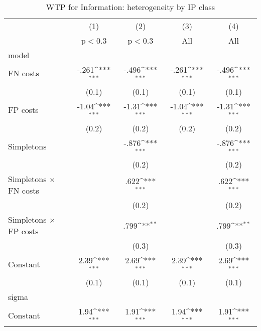 \begin{table}[htbp]\centering
\def\sym#1{\ifmmode^{#1}\else\(^{#1}\)\fi}
\caption{WTP for Information: heterogeneity by IP class}
\begin{tabular}{l*{4}{c}}
\hline\hline
                &\multicolumn{1}{c}{(1)}&\multicolumn{1}{c}{(2)}&\multicolumn{1}{c}{(3)}&\multicolumn{1}{c}{(4)}\\
                &\multicolumn{1}{c}{p$<$0.3}&\multicolumn{1}{c}{p$<$0.3}&\multicolumn{1}{c}{All}&\multicolumn{1}{c}{All}\\
\hline
model           &                  &                  &                  &                  \\
FN costs        &    -.261\sym{***}&    -.496\sym{***}&    -.261\sym{***}&    -.496\sym{***}\\
                &    (0.1)         &    (0.1)         &    (0.1)         &    (0.1)         \\
FP costs        &    -1.04\sym{***}&    -1.31\sym{***}&    -1.04\sym{***}&    -1.31\sym{***}\\
                &    (0.2)         &    (0.2)         &    (0.2)         &    (0.2)         \\
Simpletons      &                  &    -.876\sym{***}&                  &    -.876\sym{***}\\
                &                  &    (0.2)         &                  &    (0.2)         \\
Simpletons $\times$ FN costs&                  &     .622\sym{***}&                  &     .622\sym{***}\\
                &                  &    (0.2)         &                  &    (0.2)         \\
Simpletons $\times$ FP costs&                  &     .799\sym{**} &                  &     .799\sym{**} \\
                &                  &    (0.3)         &                  &    (0.3)         \\
Constant        &     2.39\sym{***}&     2.69\sym{***}&     2.39\sym{***}&     2.69\sym{***}\\
                &    (0.1)         &    (0.1)         &    (0.1)         &    (0.1)         \\
\hline
sigma           &                  &                  &                  &                  \\
Constant        &     1.94\sym{***}&     1.91\sym{***}&     1.94\sym{***}&     1.91\sym{***}\\

\end{tabular}
\end{table}

